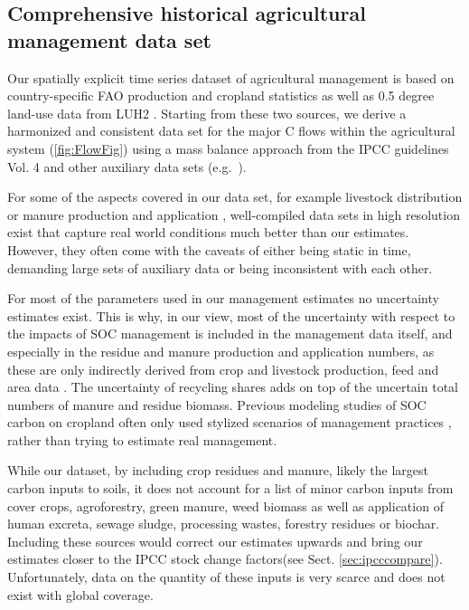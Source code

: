 \documentclass[gc, manuscript]{copernicus}
\begin{document}
\hypertarget{comprehensive-historical-agricultural-management-data-set}{%
\subsection{Comprehensive historical agricultural management data set}\label{comprehensive-historical-agricultural-management-data-set}}

Our spatially explicit time series dataset of agricultural management
is based on country-specific FAO production and cropland statistics \citep{faostat_faostat_2016} as well as 0.5 degree land-use data from LUH2 \citep{hurtt_harmonization_2020}. Starting from these two sources, we derive a harmonized and consistent data set for the major C flows within the agricultural system (\ref{fig:FlowFig}) using a mass balance approach from the IPCC guidelines Vol. 4 \citep{eggleston_ipcc_2006, calvo_buendia_ipcc_2019} and other auxiliary data sets (e.g.~\citep{porwollik_generating_2019}).

For some of the aspects covered in our data set, for example livestock distribution \citep{robinson_mapping_2014} or manure production and application \citep{zhang_global_2017}, well-compiled data sets in high resolution exist that capture real world conditions much better than our estimates. However, they often come with the caveats of either being static in time, demanding large sets of auxiliary data or being inconsistent with each other.

For most of the parameters used in our management estimates no uncertainty estimates exist. This is why, in our view, most of the uncertainty with respect to the impacts of SOC management is included in the management data itself, and especially in the residue and manure production and application numbers, as these are only indirectly derived from crop and livestock production, feed and area data \citep{faostat_faostat_2016, weindl_livestock_2017}. The uncertainty of recycling shares adds on top of the uncertain total numbers of manure and residue biomass. Previous modeling studies of SOC carbon on cropland often only used stylized scenarios of management practices \citep{pugh_simulated_2015, lutz_simulating_2019}, rather than trying to estimate real management.

While our dataset, by including crop residues and manure, likely the largest carbon inputs to soils, it does not account for a list of minor carbon inputs from cover crops, agroforestry, green manure, weed biomass as well as application of human excreta, sewage sludge, processing wastes, forestry residues or biochar. Including these sources would correct our estimates upwards and bring our estimates closer to the IPCC stock change factors(see Sect. \ref{sec:ipcccompare}). Unfortunately, data on the quantity of these inputs is very scarce and does not exist with global coverage.
\end{document}
